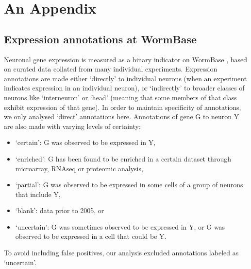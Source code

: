 \chapter{An Appendix}


\section{Expression annotations at WormBase}
\label{app:AppendixCh2_1}

Neuronal gene expression is measured as a binary indicator on WormBase \citep{Harris2010}, based on curated data collated
from many individual experiments. Expression annotations are made either ‘directly’ to individual neurons (when
an experiment indicates expression in an individual neuron), or ‘indirectly’ to broader classes of neurons like
‘interneuron’ or ‘head’ (meaning that some members of that class exhibit expression of that gene). In order to
maintain specificity of annotations, we only analysed ‘direct' annotations here.
Annotations of gene G to neuron Y are also made with varying levels of certainty:
\begin{itemize}
\item ‘certain’: G was observed to be expressed in Y,
\item ‘enriched’: G has been found to be enriched in a certain dataset through microarray, RNAseq or
proteomic analysis,
\item ‘partial’: G was observed to be expressed in some cells of a group of neurons that include Y,
\item ‘blank’: data prior to 2005, or
\item ‘uncertain’: G was sometimes observed to be expressed in Y, or G was observed to be expressed in a cell
that could be Y.
\end{itemize}

To avoid including false positives, our analysis excluded annotations labeled as ‘uncertain’.

